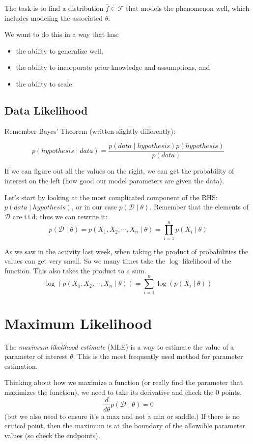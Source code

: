 The task is to find a distribution $\hat{f}\in\mathcal{F}$ that models the phenomenon well,
which includes modeling the associated $\theta$. 

We want to do this in a way that has:
\begin{itemize} 
\item the ability to generalize well, 
\item the ability to incorporate prior knowledge and assumptions, and 
\item the ability to scale.
\end{itemize}

\subsection{Data Likelihood}
Remember Bayes' Theorem (written slightly differently): 

\[p(hypothesis \mid data) = \frac{p(data \mid hypothesis) p(hypothesis)}{p(data)}\]

If we can figure out all the values on the right, we can get the probability of interest on the left 
(how good our model parameters are given the data).  

Let's start by looking at the most complicated component of the RHS: $p(data \mid hypothesis)$, 
or in our case $p(\mathcal{D} \mid \theta)$. 
Remember that the elements of $\mathcal{D}$ are i.i.d. thus we can rewrite it: 
\[p(\mathcal{D} \mid \theta) = p(X_1,X_2,\cdots,X_n\mid\theta) = \prod_{i=1}^n p(X_i \mid \theta)\]

\begin{aside}
As we saw in the activity last week, when taking the product of probabilities the values can get very small. 
So we many times take the $\log$ likelihood of the function. 
This also takes the product to a sum. 
\[ \log(p(X_1,X_2,\cdots,X_n\mid\theta)) = \sum_{i=1}^n \log(p(X_i \mid \theta))\]
\end{aside}

\section{Maximum Likelihood}
The \emph{maximum likelihood estimate} (MLE) is a way to estimate the value of a parameter of interest $\theta$.
This is the most frequently used method for parameter estimation. 

Thinking about how we maximize a function (or really find the parameter that maximizes the function), 
we need to take its derivative and check the $0$ points. 
\[\frac{d}{d\theta}p(\mathcal{D}\mid \theta)=0\]
(but we also need to ensure it's a max and not a min or saddle.)
If there is no critical point, then the maximum is at the boundary of the allowable parameter values (so check the endpoints). 

